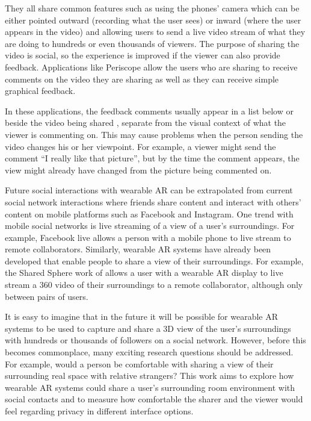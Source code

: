 They all share common features such as using the phones' camera which can be either pointed outward (recording what the user sees) or inward (where the user appears in the video) and allowing users to send a live video stream of what they are doing to hundreds or even thousands of viewers. The purpose of sharing the video is social, so the experience is improved if the viewer can also provide feedback. Applications like Periscope allow the users who are sharing to receive comments on the video they are sharing as well as they can receive simple graphical feedback. 

In these applications, the feedback comments usually appear in a list below or beside the video being shared , separate from the visual context of what the viewer is commenting on. This may cause problems when the person sending the video changes his or her viewpoint. For example, a viewer might send the comment “I really like that picture”, but by the time the comment appears, the view might already have changed from the picture being commented on.


Future social interactions with wearable AR can be extrapolated from current social network interactions where friends share content and interact with others' content on mobile platforms such as Facebook and Instagram. One trend with mobile social networks is live streaming of a view of a user’s surroundings. For example, Facebook live allows a person with a mobile phone to live stream to remote collaborators. Similarly, wearable AR systems have already been developed that enable people to share a view of their surroundings. For example, the Shared Sphere work of \cite{lee2017mixed} allows a user with a wearable AR display to live stream a 360 video of their surroundings to a remote collaborator, although only between pairs of users. 

It is easy to imagine that in the future it will be possible for wearable AR systems to be used to capture and share a 3D view of the user's surroundings with hundreds or thousands of followers on a social network. However, before this becomes commonplace, many exciting research questions should be addressed. For example, would a person be comfortable with sharing a view of their surrounding real space with relative strangers? This work aims to explore how wearable AR systems could share a user’s surrounding room environment with social contacts and to measure how comfortable the sharer and the viewer would feel regarding privacy in different interface options. 


